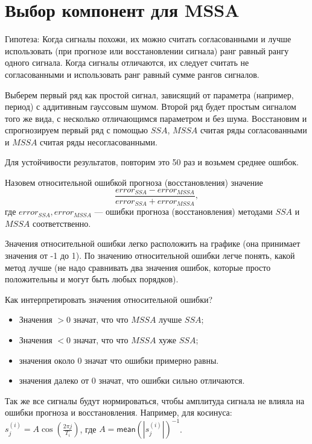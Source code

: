 \documentclass[specialist, substylefile = spbureport.rtx,
    subf,href,colorlinks=true, 12pt]{disser}
\newcommand{\mean}{\mathsf{mean}}
\begin{document}
    \section{Выбор компонент для MSSA}
        Гипотеза: Когда сигналы похожи, их можно считать согласованными и лучше использовать (при прогнозе или восстановлении сигнала) ранг равный рангу одного сигнала. Когда сигналы отличаются, их следует считать не согласованными и использовать ранг равный сумме рангов сигналов.

        Выберем первый ряд как простой сигнал, зависящий от параметра (например, период) с аддитивным гауссовым шумом.
        Второй ряд будет простым сигналом того же вида, с несколько отличающимся параметром и без шума.
        Восстановим и спрогнозируем первый ряд с помощью $SSA$, $MSSA$ считая ряды согласованными и $MSSA$ считая ряды несогласованными.

        Для устойчивости результатов, повторим это 50 раз и возьмем среднее ошибок.

        Назовем относительной ошибкой прогноза (восстановления) значение $$\displaystyle \frac{error_{SSA} - error_{MSSA}}{error_{SSA} + error_{MSSA}},$$ где $error_{SSA}, error_{MSSA}$ --- ошибки прогноза (восстановления) методами $SSA$ и $MSSA$ соответственно.
        
        Значения относительной ошибки легко расположить на графике (она принимает значения от -1 до 1). По значению относительной ошибки легче понять, какой метод лучше (не надо сравнивать два значения ошибок, которые просто положительны и могут быть любых порядков).
        
        Как интерпретировать значения относительной ошибки? 
        \begin{itemize}
            \item Значения $>0$ значат, что что $MSSA$ лучше $SSA$;
            \item Значения $<0$ значат, что что $MSSA$ хуже $SSA$;
            \item значения около $0$ значат что ошибки примерно равны.
            \item значения далеко от $0$ значат, что ошибки сильно отличаются.
        \end{itemize}

        Так же все сигналы будут нормироваться, чтобы амплитуда сигнала не влияла на ошибки прогноза и восстановления. Например, для косинуса: $s_j^{(i)} = A \cos(\frac{2\pi j}{T_i})$, где $A = \mean(|s_j^{(i)}|)^{-1}$.
\end{document}
